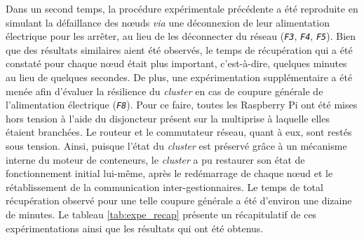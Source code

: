 Dans un second temps, la procédure expérimentale précédente a été reproduite en simulant la défaillance des n\oe{}uds \textit{via} une déconnexion de leur alimentation électrique pour les arrêter, au lieu de les déconnecter du réseau (\textit{\texttt{F3}}, \textit{\texttt{F4}}, \textit{\texttt{F5}}). Bien que des résultats similaires aient été observés, le temps de récupération qui a été constaté pour chaque n\oe{}ud était plus important, c'est-à-dire, quelques minutes au lieu de quelques secondes. De plus, une expérimentation supplémentaire a été menée afin d'évaluer la résilience du \textit{cluster} en cas de coupure générale de l'alimentation électrique (\textit{\texttt{F8}}). Pour ce faire, toutes les Raspberry Pi ont été mises hors tension à l'aide du disjoncteur présent sur la multiprise à laquelle elles étaient branchées. Le routeur et le commutateur réseau, quant à eux, sont restés sous tension. Ainsi, puisque l'état du \textit{cluster} est préservé grâce à un mécanisme interne du moteur de conteneurs, le \textit{cluster} a pu restaurer son état de fonctionnement initial lui-même, après le redémarrage de chaque n\oe{}ud et le rétablissement de la communication inter-gestionnaires. Le temps de total récupération observé pour une telle coupure générale a été d'environ une dizaine de minutes. Le tableau \ref{tab:expe_recap} présente un récapitulatif de ces expérimentations ainsi que les résultats qui ont été obtenus.

